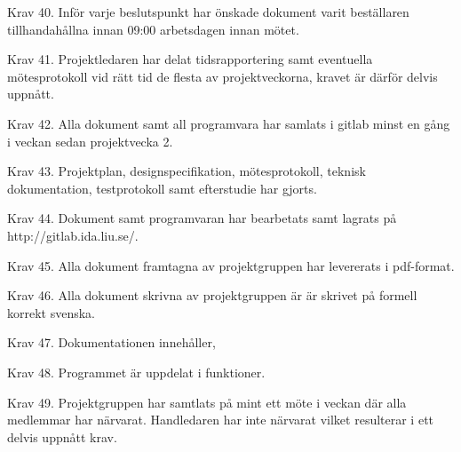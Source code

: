 Krav 40. Inför varje beslutspunkt har önskade dokument varit beställaren
tillhandahållna innan 09:00 arbetsdagen innan mötet. 

Krav 41. Projektledaren har delat tidsrapportering samt eventuella
mötesprotokoll vid rätt tid de flesta av projektveckorna, kravet är därför
delvis uppnått.

Krav 42. Alla dokument samt all programvara har samlats i gitlab minst en gång i
veckan sedan projektvecka 2. 

Krav 43. Projektplan, designspecifikation, mötesprotokoll, teknisk
dokumentation, testprotokoll samt efterstudie har gjorts. 

Krav 44. Dokument samt programvaran har bearbetats samt lagrats på
http://gitlab.ida.liu.se/.  

Krav 45. Alla dokument framtagna av projektgruppen har levererats i pdf-format. 

Krav 46. Alla dokument skrivna av projektgruppen är är skrivet på formell
korrekt svenska.

Krav 47. Dokumentationen innehåller, 

Krav 48. Programmet är uppdelat i funktioner. 

Krav 49. Projektgruppen har samtlats på mint ett möte i veckan där alla
medlemmar har närvarat. Handledaren har inte närvarat vilket resulterar i ett
delvis uppnått krav. 
